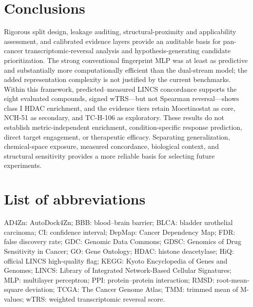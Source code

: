\section{Conclusions}

\begin{roundtworevision}
Rigorous split design, leakage auditing, structural-proximity and applicability assessment, and calibrated evidence layers provide an auditable basis for pan-cancer transcriptomic-reversal analysis and hypothesis-generating candidate prioritization. The strong conventional fingerprint MLP was at least as predictive and substantially more computationally efficient than the dual-stream model; the added representation complexity is not justified by the current benchmarks. Within this framework, predicted--measured LINCS concordance supports the eight evaluated compounds, signed wTRS---but not Spearman reversal---shows class I HDAC enrichment, and the evidence tiers retain Mocetinostat as core, NCH-51 as secondary, and TC-H-106 as exploratory. These results do not establish metric-independent enrichment, condition-specific response prediction, direct target engagement, or therapeutic efficacy. Separating generalization, chemical-space exposure, measured concordance, biological context, and structural sensitivity provides a more reliable basis for selecting future experiments.
\end{roundtworevision}

\section*{List of abbreviations}

\begin{minorrevision}
AD4Zn: AutoDock4Zn; BBB: blood--brain barrier; BLCA: bladder urothelial carcinoma; CI: confidence interval; DepMap: Cancer Dependency Map; FDR: false discovery rate; GDC: Genomic Data Commons; GDSC: Genomics of Drug Sensitivity in Cancer; GO: Gene Ontology; HDAC: histone deacetylase; HiQ: official LINCS high-quality flag; KEGG: Kyoto Encyclopedia of Genes and Genomes; LINCS: Library of Integrated Network-Based Cellular Signatures; MLP: multilayer perceptron; PPI: protein--protein interaction; RMSD: root-mean-square deviation; TCGA: The Cancer Genome Atlas; TMM: trimmed mean of M-values; wTRS: weighted transcriptomic reversal score.\par
\end{minorrevision}
